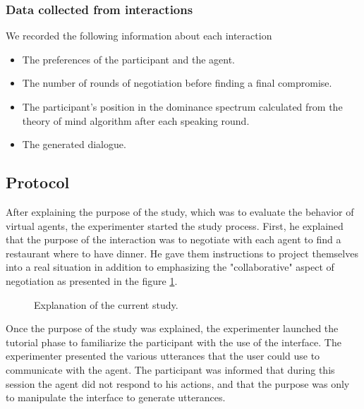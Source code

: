 \documentclass{llncs}
\begin{document}
\subsubsection{Data collected from interactions}
We recorded the following information about each interaction
\begin{itemize}
	\item The preferences of the participant and the agent.
	\item The number of rounds of negotiation before finding a final compromise.
	\item The participant's position in the dominance spectrum calculated from the theory of mind algorithm after each speaking round.
	\item The generated dialogue.
	
\end{itemize}


\subsection{Protocol}
\label{sec:proto}
After explaining the purpose of the study, which was to evaluate the behavior of virtual agents, the experimenter started the study process. 
First, he explained that the purpose of the interaction was to negotiate with each agent to find a restaurant where to have dinner. He gave them instructions to project themselves into a real situation in addition to emphasizing the "collaborative" aspect of negotiation as presented in the figure \ref{fig:instruction}.

	\begin{figure}[h]
		
		\caption{\label{fig:instruction}Explanation of the current study.}
	\end{figure}

Once the purpose of the study was explained, the experimenter launched the tutorial phase to familiarize the participant with the use of the interface. The experimenter presented the various utterances that the user could use to communicate with the agent. 	
The participant was informed that during this session the agent did not respond to his actions, and that the purpose was only to manipulate the interface to generate utterances. 
\end{document}

